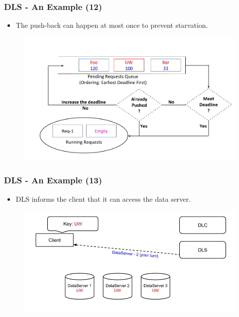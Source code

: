 \documentclass{beamer}
\begin{document}
\begin{frame}
  \frametitle{DLS - An Example (12)}
  \begin{itemize}
  \item The push-back can happen at most once to prevent starvation.
    \newline
    \newline
  \end{itemize}
  \vspace{-5 mm}
  \begin{figure}
    \begin{center}
      \centerline{\includegraphics[scale=0.33]{img/DLS_Example_ZOOM_6.png}}
    \end{center}
  \end{figure}
\end{frame}

\begin{frame}
  \frametitle{DLS - An Example (13)}
  \begin{itemize}
  \item DLS informs the client that it can access the data server.
\newline
  \end{itemize}
  \begin{figure}
    \begin{center}
      \centerline{\includegraphics[scale=0.40]{img/DLS_Example07.png}}
    \end{center}
  \end{figure}
\end{frame}
\end{document}
